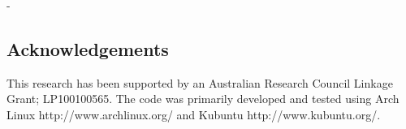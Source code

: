 -\documentclass[article]{jss}
\begin{document}
\subsection*{Acknowledgements}

This research has been supported by an Australian Research Council
Linkage Grant; \newline LP100100565. The code was primarily developed and
tested using Arch Linux \newline http://www.archlinux.org/ and Kubuntu
http://www.kubuntu.org/.


\end{document}
